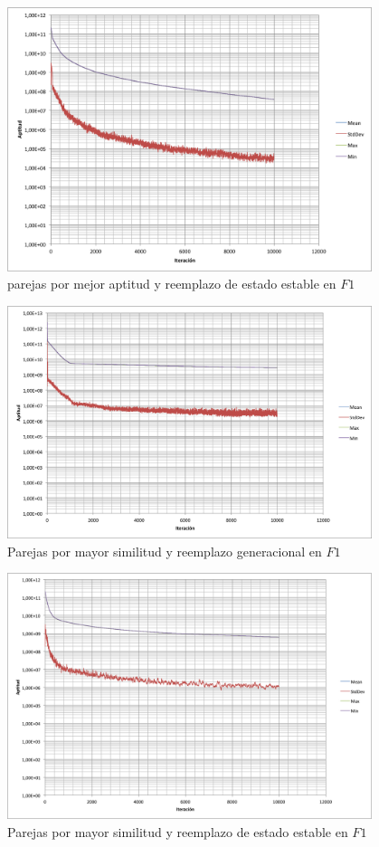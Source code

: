 \documentclass{llncs}
\begin{document}
\begin{figure}
  \centering
    \includegraphics[width=0.95\textwidth]{bestFitSteady}
  \caption{parejas por mejor aptitud  y reemplazo de estado estable en  $F1$}
  \label{Ejecucion_2}
\end{figure}


\begin{figure}
  \centering
    \includegraphics[width=0.95\textwidth]{similarityGen}
  \caption{Parejas por mayor similitud  y reemplazo generacional en $F1$}
  \label{Ejecucion_3}
\end{figure}

\begin{figure}
  \centering
    \includegraphics[width=0.95\textwidth]{similaritySteady}
  \caption{Parejas por mayor similitud  y reemplazo de estado estable en $F1$}
  \label{Ejecucion_4}
\end{figure}
\end{document}
